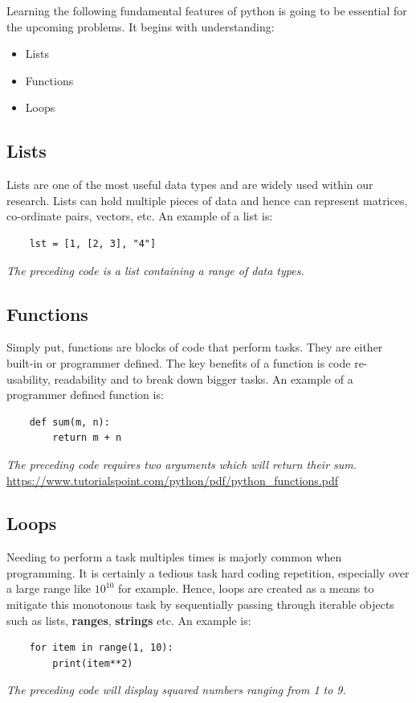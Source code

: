 \documentclass[11pt]{article}
\begin{document}
Learning the following fundamental features of python is going to be essential for the upcoming problems. It begins with understanding:
\begin{itemize}
    \item Lists
    \item Functions
    \item Loops
\end{itemize}

\subsection{Lists}
Lists are one of the most useful data types and are widely used within our research. Lists can hold multiple pieces of data and hence can represent matrices, co-ordinate pairs, vectors, etc. An example of a list is: 
\begin{verbatim}
    lst = [1, [2, 3], "4"]
\end{verbatim}
\textit{The preceding code is a list containing a range of data types.}

\subsection{Functions}
Simply put, functions are blocks of code that perform tasks. They are either built-in or programmer defined. The key benefits of a function is code re-usability, readability and to break down bigger tasks. An example of a programmer defined function is: 
\begin{verbatim}
    def sum(m, n):
        return m + n
\end{verbatim}  
\textit{The preceding code requires two arguments which will return their sum.}
\href{https://www.tutorialspoint.com/python/pdf/python_functions.pdf}{https://www.tutorialspoint.com/python/pdf/python_functions.pdf}\\

\subsection{Loops}
Needing to perform a task multiples times is majorly common when programming. It is certainly a tedious task hard coding repetition, especially over a large range like $10^{10}$ for example. Hence, loops are created as a means to mitigate this monotonous task by sequentially passing through iterable objects such as lists, \textbf{ranges}, \textbf{strings} etc. An example is: 
\begin{verbatim}
    for item in range(1, 10):
        print(item**2)
\end{verbatim}
\textit{The preceding code will display squared numbers ranging from 1 to 9.}
\end{document}
